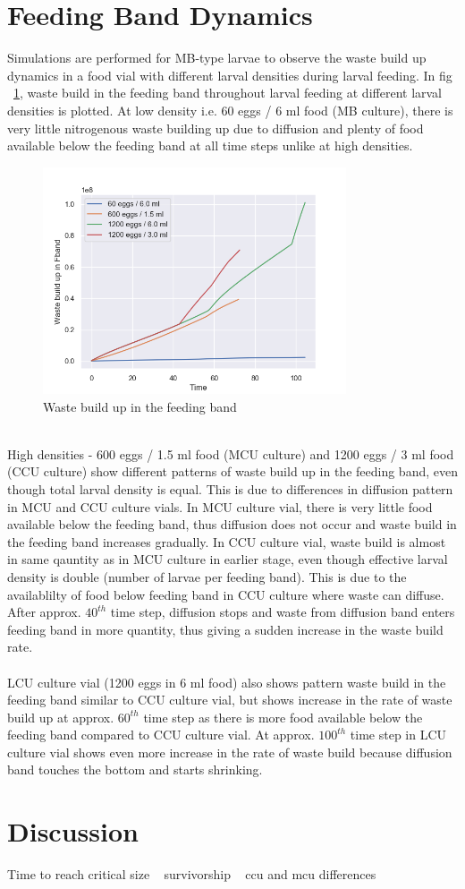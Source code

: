 \newpage
\section{Feeding Band Dynamics}
Simulations are performed for MB-type larvae to observe the waste build up dynamics in a food vial with different larval densities during larval feeding. In fig ~\ref{fig:waste}, waste build in the feeding band throughout larval feeding at different larval densities is plotted. At low density i.e. 60 eggs / 6 ml food (MB culture), there is very little nitrogenous waste building up due to diffusion and plenty of food available below the feeding band at all time steps unlike at high densities. \\
\begin{figure}[h]
  \centering
  \includegraphics[width=0.8\textwidth]{C2/Figs/waste build up}
  \caption{Waste build up in the feeding band}
  \label{fig:waste}
\end{figure}\\

High densities - 600 eggs / 1.5 ml food (MCU culture) and 1200 eggs / 3 ml food (CCU culture) show different patterns of waste build up in the feeding band, even though total larval density is equal. This is due to differences in diffusion pattern in MCU and CCU culture vials. In MCU culture vial, there is very little food available below the feeding band, thus diffusion does not occur and waste build in the feeding band increases gradually. In CCU culture vial, waste build is almost in same qauntity as in MCU culture in earlier stage, even though effective larval density is double (number of larvae per feeding band). This is due to the availablilty of food below feeding band in CCU culture where waste can diffuse. After approx. $40^{th}$ time step, diffusion stops and waste from diffusion band enters feeding band in more quantity, thus giving a sudden increase in the waste build rate. \\ \\
LCU culture vial (1200 eggs in 6 ml food) also shows pattern waste build in the feeding band similar to CCU culture vial, but shows increase in the rate of waste build up at approx. $60^{th}$ time step as there is more food available below the feeding band compared to CCU culture vial. At approx. $100^{th}$ time step in LCU culture vial shows even more increase in the rate of waste build because diffusion band touches the bottom and starts shrinking.

\section{Discussion}
Time to reach critical size ~ survivorship ~ ccu and mcu differences
\pagebreak
\renewcommand\bibname{{References}}


